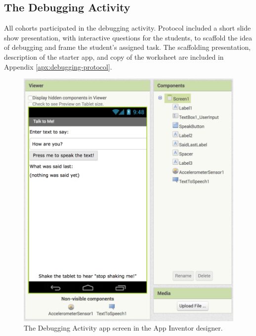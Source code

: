 


\subsection{The Debugging Activity}
All cohorts participated in the debugging activity. Protocol included a short slide show presentation, with interactive questions for the students, to scaffold the idea of debugging and frame the student's assigned task. The scaffolding presentation, description of the starter app, and copy of the worksheet are included in Appendix \ref{apx:debugging-protocol}.

\begin{figure}
  \centering
      \includegraphics[width=\textwidth]{images/debugActivity/debug-designer}
  \caption[The Debugging Activity designer view]{The Debugging Activity app screen in the App Inventor designer.}
  \label{fig:debug-screen}
\end{figure}

